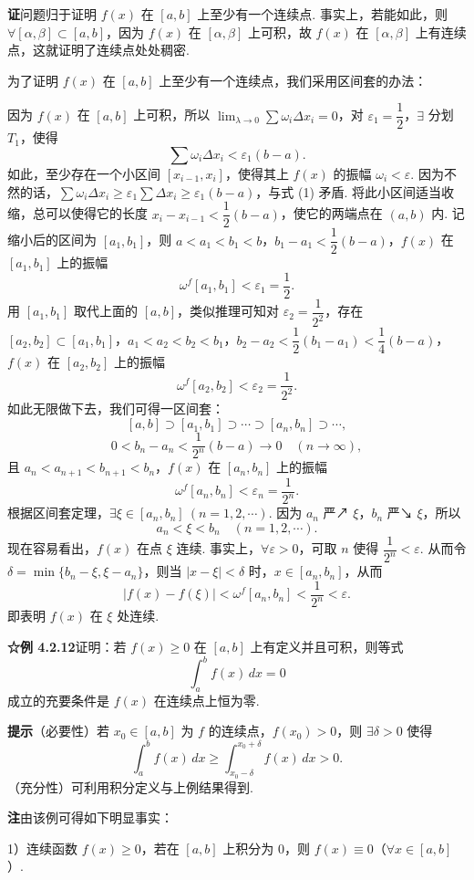 \documentclass[UTF8, 12pt, fontset=fandol, oneside]{ctexart}
\begin{document}
\noindent\textbf{证}\quad 问题归于证明 $f(x)$ 在 $[a,b]$ 上至少有一个连续点. 事实上，若能如此，则 $\forall[\alpha,\beta]\subset[a,b]$，因为 $f(x)$ 在 $[\alpha,\beta]$ 上可积，故 $f(x)$ 在 $[\alpha,\beta]$ 上有连续点，这就证明了连续点处处稠密.

为了证明 $f(x)$ 在 $[a,b]$ 上至少有一个连续点，我们采用区间套的办法：

因为 $f(x)$ 在 $[a,b]$ 上可积，所以 $\lim_{\lambda\to0}\sum\omega_i\Delta x_i=0$，对 $\varepsilon_1=\dfrac12$，$\exists$ 分划 $T_1$，使得
\[
\sum\omega_i\Delta x_i<\varepsilon_1(b-a).
\tag{1}
\]
如此，至少存在一个小区间 $[x_{i-1},x_i]$，使得其上 $f(x)$ 的振幅 $\omega_i<\varepsilon$. 因为不然的话，$\sum\omega_i\Delta x_i\ge\varepsilon_1\sum\Delta x_i\ge\varepsilon_1(b-a)$，与式 (1) 矛盾. 将此小区间适当收缩，总可以使得它的长度 $x_i-x_{i-1}<\dfrac12(b-a)$，使它的两端点在 $(a,b)$ 内. 记缩小后的区间为 $[a_1,b_1]$，则 $a<a_1<b_1<b$，$b_1-a_1<\dfrac12(b-a)$，$f(x)$ 在 $[a_1,b_1]$ 上的振幅
\[
\omega^f[a_1,b_1]<\varepsilon_1=\frac12.
\]
用 $[a_1,b_1]$ 取代上面的 $[a,b]$，类似推理可知对 $\varepsilon_2=\dfrac1{2^2}$，存在 $[a_2,b_2]\subset[a_1,b_1]$，$a_1<a_2<b_2<b_1$，$b_2-a_2<\dfrac12(b_1-a_1)<\dfrac14(b-a)$，$f(x)$ 在 $[a_2,b_2]$ 上的振幅
\[
\omega^f[a_2,b_2]<\varepsilon_2=\frac1{2^2}.
\]
如此无限做下去，我们可得一区间套：
\[
[a,b]\supset[a_1,b_1]\supset\cdots\supset[a_n,b_n]\supset\cdots,
\]
\[
0<b_n-a_n<\frac1{2^n}(b-a)\to0\quad(n\to\infty),
\]
且 $a_n<a_{n+1}<b_{n+1}<b_n$，$f(x)$ 在 $[a_n,b_n]$ 上的振幅
\[
\omega^f[a_n,b_n]<\varepsilon_n=\frac1{2^n}.
\]
根据区间套定理，$\exists\xi\in[a_n,b_n]\ (n=1,2,\cdots)$. 因为 $a_n$ 严↗ $\xi$，$b_n$ 严↘ $\xi$，所以
\[
a_n<\xi<b_n\quad(n=1,2,\cdots).
\]
现在容易看出，$f(x)$ 在点 $\xi$ 连续. 事实上，$\forall\varepsilon>0$，可取 $n$ 使得 $\dfrac1{2^n}<\varepsilon$. 从而令 $\delta=\min\{b_n-\xi,\xi-a_n\}$，则当 $|x-\xi|<\delta$ 时，$x\in[a_n,b_n]$，从而
\[
|f(x)-f(\xi)|<\omega^f[a_n,b_n]<\frac1{2^n}<\varepsilon.
\]
即表明 $f(x)$ 在 $\xi$ 处连续.

\noindent\textbf{☆例 4.2.12}\quad 证明：若 $f(x)\ge0$ 在 $[a,b]$ 上有定义并且可积，则等式
\[
\int_a^b f(x)\,dx=0
\]
成立的充要条件是 $f(x)$ 在连续点上恒为零.

\noindent\textbf{提示}\quad （必要性）若 $x_0\in[a,b]$ 为 $f$ 的连续点，$f(x_0)>0$，则 $\exists\delta>0$ 使得
\[
\int_a^b f(x)\,dx\ge\int_{x_0-\delta}^{x_0+\delta}f(x)\,dx>0.
\]
（充分性）可利用积分定义与上例结果得到.

\noindent\textbf{注}\quad 由该例可得如下明显事实：

1）连续函数 $f(x)\ge0$，若在 $[a,b]$ 上积分为 0，则 $f(x)\equiv0$（$\forall x\in[a,b]$）.
\end{document}
